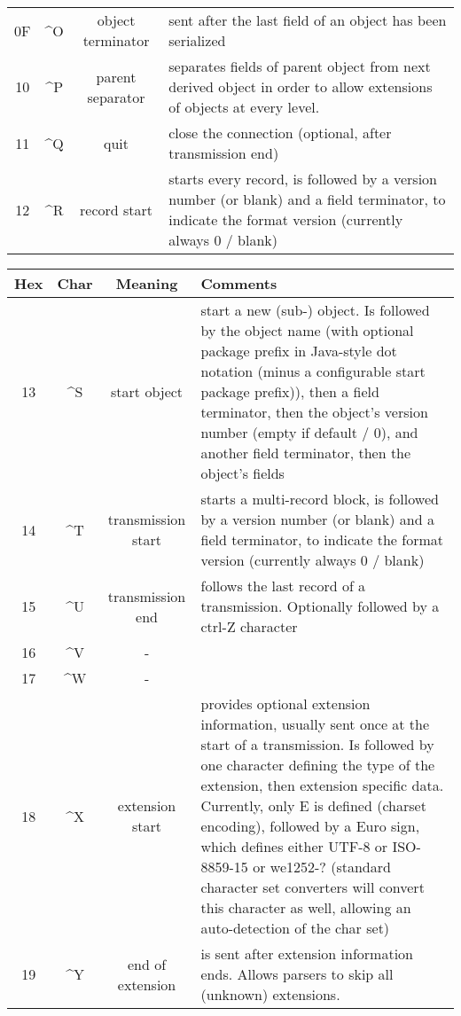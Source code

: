 \documentclass[11pt,a4paper,oneside]{article}
\begin{document}
\begin{tabular}{|c|c|c|p{8cm}|}
0F & \textasciicircum O &
object terminator & sent after the last field of an object has been serialized\\
10 & \textasciicircum P & parent separator   & separates fields of parent object
from next derived object in order to allow extensions of objects at every level.\\
11 & \textasciicircum Q & quit      & close the connection (optional, after
transmission end)
\\
12 & \textasciicircum R & record start       & starts every record, is
followed by a version number (or blank) and a field terminator, to indicate
the format version (currently always 0 / blank) \\
\hline
\end{tabular}

\begin{tabular}{|c|c|c|p{8cm}|}
\hline
Hex & Char & Meaning & Comments \\
\hline
13 & \textasciicircum S & start object       & start a new (sub-) object. Is
followed by the object name (with optional package prefix in Java-style dot notation (minus a
configurable start package prefix)), then a field terminator, then the object's
version number (empty if default / 0), and another field terminator, then the
object's fields \\
14 & \textasciicircum T & transmission start & starts a multi-record block, is
followed by a version number (or blank) and a field terminator, to indicate
the format version (currently always 0 / blank) \\
15 & \textasciicircum U & transmission end   & follows the last record of a
transmission. Optionally followed by a ctrl-Z character \\
16 & \textasciicircum V &       -            & \\
17 & \textasciicircum W &       -            & \\
18 & \textasciicircum X & extension start   & provides optional extension information,
usually sent once at the start of a transmission. Is followed by one character
defining the type of the extension, then extension specific data. Currently,
only E is defined (charset encoding), followed by a Euro sign, which defines
either UTF-8 or ISO-8859-15 or we1252-? (standard character set converters will
convert this character as well, allowing an auto-detection of the char set)\\
19 & \textasciicircum Y & end of extension  & is sent after extension information ends.
Allows parsers to skip all (unknown) extensions. \\

\end{tabular}
\end{document}
